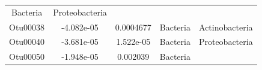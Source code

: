 \documentclass[]{article}
\begin{document}
\begin{longtable}[]{@{}ccccc@{}}
\begin{minipage}[t]{0.13\columnwidth}
Bacteria\strut
\end{minipage} & \begin{minipage}[t]{0.27\columnwidth}\centering\strut
Proteobacteria\strut
\end{minipage}\tabularnewline
\begin{minipage}[t]{0.13\columnwidth}\centering\strut
Otu00038\strut
\end{minipage} & \begin{minipage}[t]{0.16\columnwidth}\centering\strut
-4.082e-05\strut
\end{minipage} & \begin{minipage}[t]{0.14\columnwidth}\centering\strut
0.0004677\strut
\end{minipage} & \begin{minipage}[t]{0.13\columnwidth}\centering\strut
Bacteria\strut
\end{minipage} & \begin{minipage}[t]{0.27\columnwidth}\centering\strut
Actinobacteria\strut
\end{minipage}\tabularnewline
\begin{minipage}[t]{0.13\columnwidth}\centering\strut
Otu00040\strut
\end{minipage} & \begin{minipage}[t]{0.16\columnwidth}\centering\strut
-3.681e-05\strut
\end{minipage} & \begin{minipage}[t]{0.14\columnwidth}\centering\strut
1.522e-05\strut
\end{minipage} & \begin{minipage}[t]{0.13\columnwidth}\centering\strut
Bacteria\strut
\end{minipage} & \begin{minipage}[t]{0.27\columnwidth}\centering\strut
Proteobacteria\strut
\end{minipage}\tabularnewline
\begin{minipage}[t]{0.13\columnwidth}\centering\strut
Otu00050\strut
\end{minipage} & \begin{minipage}[t]{0.16\columnwidth}\centering\strut
-1.948e-05\strut
\end{minipage} & \begin{minipage}[t]{0.14\columnwidth}\centering\strut
0.002039\strut
\end{minipage} & \begin{minipage}[t]{0.13\columnwidth}\centering\strut
Bacteria\strut
\end{minipage} & \begin{minipage}[t]{0.27\columnwidth}\centering\strut

\end{minipage}
\end{longtable}
\end{document}
